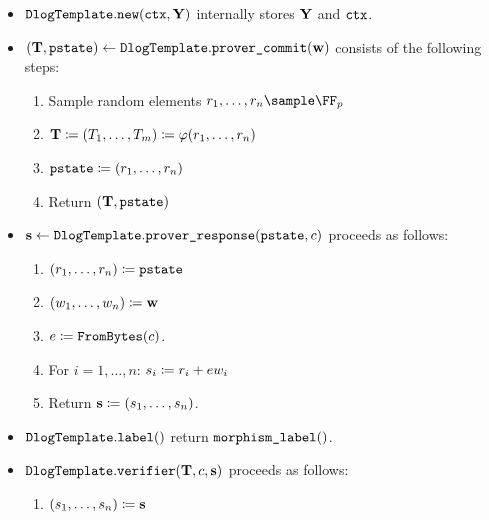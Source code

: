 \documentclass[11pt]{article}
\begin{document}
\begin{itemize}
  \item $\texttt{DlogTemplate}.\texttt{new}(\texttt{ctx}, \mathbf{Y})$ internally stores $\mathbf{Y}$ and $\texttt{ctx}$.
  \item\label{item:basic:p1}
   $(\mathbf {T}, \texttt{pstate}) \gets \texttt{DlogTemplate}.\texttt{prover\_commit}(\mathbf {w})$ consists of the following steps:
    \begin{enumerate}
      \item\label{item:basic:p1:randomness}
        Sample random elements $\randomness_1,\dots,\randomness_n\sample\FF_p$
      \item
         $\mathbf {T} \coloneqq (T_1,\dots,T_m)\coloneqq\varphi(r_1,\dots,r_n)$
      \item $\texttt{pstate}\coloneqq (r_1,\dots,r_n)$
      \item
        Return $(\mathbf {T},\texttt{pstate})$
    \end{enumerate}
  \item\label{item:basic:p2}
    $\mathbf {s} \gets \texttt{DlogTemplate}.\texttt{prover\_response}(\texttt{pstate},c)$ proceeds as follows:
    \begin{enumerate}
      \item  $(r_1,\dots,r_n)\coloneqq \texttt{pstate}$
      \item  $(w_1,\dots,w_n)\coloneqq \mathbf {w}$
      \item  $e \coloneqq \texttt{FromBytes}(c)$.
      \item For $i=1,\dots,n$: $s_i\coloneqq r_i+e w_i$
			\item Return $\mathbf{s} \coloneqq (s_1,\dots,s_n)$.
    \end{enumerate}
  \item $\texttt{DlogTemplate}.\texttt{label}()$ return $\texttt{morphism\_label}()$.
  \item\label{item:basic:v}
     $\texttt{DlogTemplate}.\texttt{verifier}(\mathbf {T},c,\mathbf {s})$ proceeds as follows:
    \begin{enumerate}
      \item  $(s_1, \dots, s_n) \coloneqq \mathbf {s}$

\end{enumerate}
\end{itemize}
\end{document}

